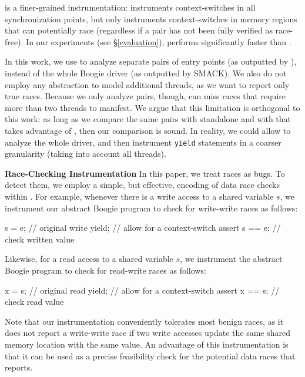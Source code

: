 \yieldmr is a finer-grained instrumentation: \whoop instruments context-switches
in all synchronization points, but only instruments context-switches in memory
regions that can potentially race (regardless if a pair has not been fully
verified as race-free). In our experiments (see \S\ref{evaluation}),
\yieldmr performs significantly faster than \yieldcoarse.

In this work, we use \corral to analyze separate pairs of entry points (as outputted by \whoop), instead of the whole Boogie driver (as outputted by SMACK). We also do not employ any abstraction to model additional threads, as we want \corral to report only true races. Because we only analyze pairs, though, \corral can miss races that require more than two threads to manifest. We argue that this limitation is orthogonal to this work: as long as we compare the same pairs with standalone \corral and with \corral that takes advantage of \whoop, then our comparison is sound. In reality, we could allow \corral to analyze the whole driver, and then instrument \texttt{yield} statements in a coarser granularity (taking into account all threads).

\medskip\noindent\textbf{Race-Checking Instrumentation }
%
In this paper, we treat races as bugs. To detect them, we employ a simple, but effective, encoding of data race checks within \corral. For example, whenever there is a write access to a shared variable $s$, we instrument our abstract Boogie program to check for write-write races as follows:
%
\begin{boogie}
s = e;         // original write
yield;         // allow for a context-switch
assert s == e; // check written value
\end{boogie}
%
Likewise, for a read access to a shared variable $s$, we instrument the abstract Boogie program to check for read-write races as follows:
%
\begin{boogie}
x = s;         // original read
yield;         // allow for a context-switch
assert x == s; // check read value
\end{boogie}

Note that our instrumentation conveniently tolerates most benign races, as it does not report a write-write race if two write accesses update the same shared memory location with the same value.  An advantage of this instrumentation is that it can be used as a precise feasibility check for the potential data races that \whoop reports.
